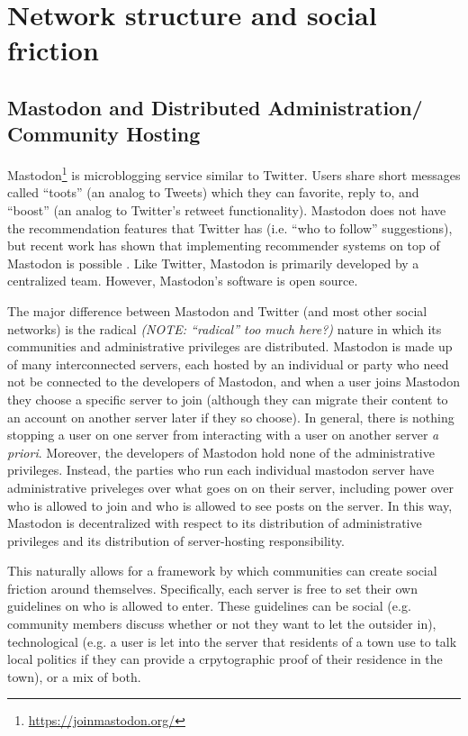 \documentclass[sigconf,authordraft]{acmart}
\begin{document}
\section{Network structure and social friction}

\subsection{Mastodon and Distributed Administration/ Community Hosting}

Mastodon\footnote{\url{https://joinmastodon.org/}} is microblogging service similar to Twitter. Users share short messages called ``toots'' (an analog to Tweets) which they can favorite, reply to, and ``boost'' (an analog to Twitter's retweet functionality). Mastodon does not have the recommendation features that Twitter has (i.e. ``who to follow'' suggestions), but recent work has shown that implementing recommender systems on top of Mastodon is possible \cite{trienes2018recommending}. Like Twitter, Mastodon is primarily developed by a centralized team. However, Mastodon's software is open source.

The major difference between Mastodon and Twitter (and most other social networks) is the radical {\itshape (NOTE: ``radical'' too much here?)} nature in which its communities and administrative privileges are distributed. Mastodon is made up of many interconnected servers, each hosted by an individual or party who need not be connected to the developers of Mastodon, and when a user joins Mastodon they choose a specific server to join (although they can migrate their content to an account on another server later if they so choose). In general, there is nothing stopping a user on one server from interacting with a user on another server {\itshape a priori}. Moreover, the developers of Mastodon hold none of the administrative privileges. Instead, the parties who run each individual mastodon server have administrative priveleges over what goes on on their server, including power over who is allowed to join and who is allowed to see posts on the server. In this way, Mastodon is decentralized with respect to its distribution of administrative privileges and its distribution of server-hosting responsibility.

This naturally allows for a framework by which communities can create social friction around themselves. Specifically, each server is free to set their own guidelines on who is allowed to enter. These guidelines can be social (e.g. community members discuss whether or not they want to let the outsider in), technological (e.g. a user is let into the server that residents of a town use to talk local politics if they can provide a crpytographic proof of their residence in the town), or a mix of both. 
\end{document}
